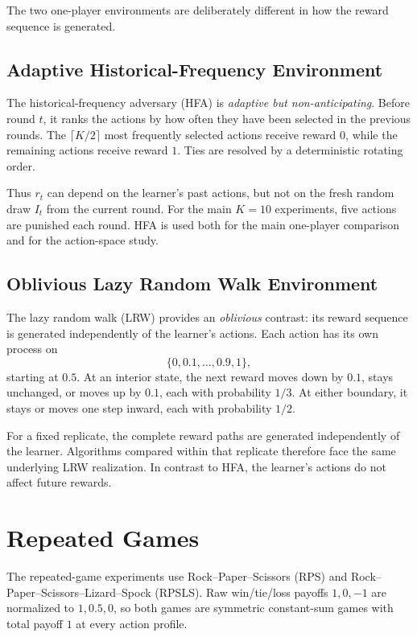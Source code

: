 The two one-player environments are deliberately different in how the reward
sequence is generated.

\subsection{Adaptive Historical-Frequency Environment}

The historical-frequency adversary (HFA) is \emph{adaptive but
non-anticipating}. Before round \(t\), it ranks the actions by how often they
have been selected in the previous rounds. The \(\lceil K/2\rceil\) most
frequently selected actions receive reward \(0\), while the remaining actions
receive reward \(1\). Ties are resolved by a deterministic rotating
order.

Thus \(r_t\) can depend on the learner's past actions, but not on the fresh
random draw \(I_t\) from the current round. For the main \(K=10\) experiments,
five actions are punished each round. HFA is used both for the main one-player
comparison and for the action-space study.

\subsection{Oblivious Lazy Random Walk Environment}

The lazy random walk (LRW) provides an \emph{oblivious} contrast: its reward
sequence is generated independently of the learner's actions. Each action has
its own process on
\[
    \{0,0.1,\ldots,0.9,1\},
\]
starting at \(0.5\). At an interior state, the next reward moves down by
\(0.1\), stays unchanged, or moves up by \(0.1\), each with probability
\(1/3\). At either boundary, it stays or moves one step inward, each with
probability \(1/2\).

For a fixed replicate, the complete reward paths are generated independently
of the learner. Algorithms compared within that replicate therefore face the
same underlying LRW realization. In contrast to HFA, the learner's actions do
not affect future rewards.

\section{Repeated Games}
\label{sec:repeated-game-method}

The repeated-game experiments use Rock--Paper--Scissors (RPS) and
Rock--Paper--Scissors--Lizard--Spock (RPSLS). Raw win/tie/loss payoffs
\(1,0,-1\) are normalized to \(1,0.5,0\), so both games are symmetric
constant-sum games with total payoff \(1\) at every action profile.

